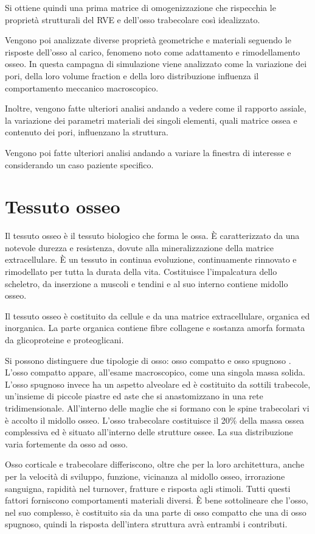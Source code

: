 \documentclass[a4paper,num-refs]{oup-contemporary}
\begin{document}
Si ottiene quindi una prima matrice di omogenizzazione che rispecchia le proprietà strutturali del RVE e dell'osso trabecolare così idealizzato. 

Vengono poi analizzate diverse proprietà geometriche e materiali seguendo le risposte dell'osso al carico, fenomeno noto come adattamento e rimodellamento osseo. In questa campagna di simulazione viene analizzato come la variazione dei pori, della loro volume fraction e della loro distribuzione influenza il comportamento meccanico macroscopico. 

Inoltre, vengono fatte ulteriori analisi andando a vedere come il rapporto assiale, la variazione dei parametri materiali dei singoli elementi, quali matrice ossea e contenuto dei pori, influenzano la struttura. 

Vengono poi fatte ulteriori analisi andando a variare la finestra di interesse e considerando un caso paziente specifico.


\section{Tessuto osseo}

Il tessuto osseo è il tessuto biologico che forma le ossa. È caratterizzato da una notevole durezza e resistenza, dovute alla mineralizzazione della matrice extracellulare. È un tessuto in continua evoluzione, continuamente rinnovato e rimodellato per tutta la durata della vita. Costituisce l'impalcatura dello scheletro, da inserzione a muscoli e tendini e al suo interno contiene midollo osseo. 

Il tessuto osseo è costituito da cellule e da una matrice extracellulare, organica ed inorganica. La parte organica contiene fibre collagene e sostanza amorfa formata da glicoproteine e proteoglicani. 

Si possono distinguere due tipologie di osso: osso compatto e osso spugnoso \citep{Monesi}. 
L'osso compatto appare, all'esame macroscopico, come una singola massa solida. L'osso spugnoso invece ha un aspetto alveolare ed è costituito da sottili trabecole, un'insieme di piccole piastre ed aste che si anastomizzano in una rete tridimensionale. All'interno delle maglie che si formano con le spine trabecolari vi è accolto il midollo osseo. L'osso trabecolare costituisce il 20\% della massa ossea complessiva ed è situato all'interno delle strutture ossee. La sua distribuzione varia fortemente da osso ad osso. 

Osso corticale e trabecolare differiscono, oltre che per la loro architettura, anche per la velocità di sviluppo, funzione, vicinanza al midollo osseo, irrorazione sanguigna, rapidità nel turnover, fratture e risposta agli stimoli. Tutti questi fattori forniscono comportamenti materiali diversi. 
È bene sottolineare che l'osso, nel suo complesso, è costituito sia da una parte di osso compatto che una di osso spugnoso, quindi la risposta dell'intera struttura avrà entrambi i contributi. 
\end{document}
